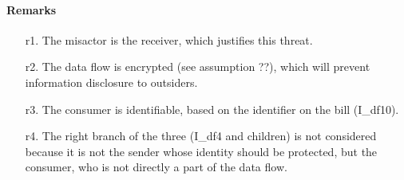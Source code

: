 \paragraph{Remarks}
\begin{enumerate}
	\item[r1.] The misactor is the receiver, which justifies this threat.
	\item[r2.] The data flow is encrypted (see assumption ??), which will prevent
	information disclosure to outsiders.
	\item[r3.] The consumer is identifiable, based on the identifier on the bill
	(I\_df10).
	\item[r4.] The right branch of the three (I\_df4 and children) is not
	considered because it is not the sender whose identity should be protected, but the
	consumer, who is not directly a part of the data flow.
\end{enumerate}
